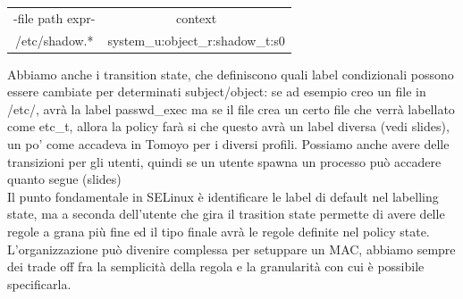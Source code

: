 \documentclass[12pt, oneside]{extbook} %
\begin{document}
\begin{tabular}{|c|c}
-file path expr- & context\\
/etc/shadow.* & system\_u:object\_r:shadow\_t:s0\\
\end{tabular}
Abbiamo anche i transition state, che definiscono quali label condizionali possono essere cambiate per determinati subject/object: se ad esempio creo un file in /etc/, avrà la label passwd\_exec ma se il file crea un certo file che verrà labellato come etc\_t, allora la policy farà si che questo avrà un label diversa (vedi slides), un po' come accadeva in Tomoyo per i diversi profili. Possiamo anche avere delle transizioni per gli utenti, quindi se un utente spawna un processo può accadere quanto segue (slides)\\Il punto fondamentale in SELinux è identificare le label di default nel labelling state, ma a seconda dell'utente che gira il trasition state permette di avere delle regole a grana più fine ed il tipo finale avrà le regole definite nel policy state.\\L'organizzazione può divenire complessa per setuppare un MAC, abbiamo sempre dei trade off fra la semplicità della regola e la granularità con cui è possibile specificarla.
\end{document}
